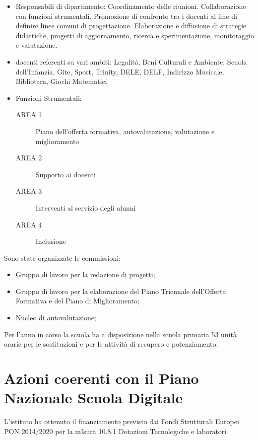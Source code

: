 \documentclass[12pt,a4paper,oneside]{memoir}
\begin{document}
\begin{itemize}
\begin{itemize}
\end{itemize}
\item Responsabili di dipartimento: Coordinamento delle riunioni. Collaborazione con funzioni strumentali. Promozione di confronto tra i docenti al fine di definire linee comuni di progettazione. Elaborazione e diffusione di strategie didattiche, progetti di aggiornamento, ricerca e sperimentazione, monitoraggio e valutazione.
\item docenti referenti su vari ambiti: Legalità, Beni Culturali e Ambiente, Scuola dell’Infanzia, Gite, Sport, Trinity, DELE, DELF, Indirizzo Musicale, Biblioteca, Giochi Matematici
\item Funzioni Strumentali:
\begin{description}
\item[AREA 1]  Piano dell’offerta formativa, autovalutazione, valutazione e miglioramento
\item[AREA 2] Supporto ai docenti 
\item[AREA 3] Interventi al servizio degli alunni
\item[AREA 4] Inclusione
\end{description}    
\end{itemize}

Sono state organizzate le commissioni:
\begin{itemize}
    \item Gruppo di lavoro per la redazione di progetti;
    \item Gruppo di lavoro per la elaborazione del Piano Triennale dell'Offerta Formativa e del Piano di Miglioramento;
    \item Nucleo di autovalutazione;
\end{itemize}

Per l'anno in corso la scuola ha a disposizione nella scuola primaria 53 unità orarie per le sostituzioni e per le attività di recupero e potenziamento.

\chapter[Azioni coerenti con il PNSD]{Azioni coerenti con il Piano Nazionale Scuola Digitale}

L'istituto ha ottenuto il finanziamento previsto dai Fondi Strutturali Europei PON  2014/2020 per la mIsura 10.8.1 Dotazioni Tecnologiche e laboratori
\end{document}
